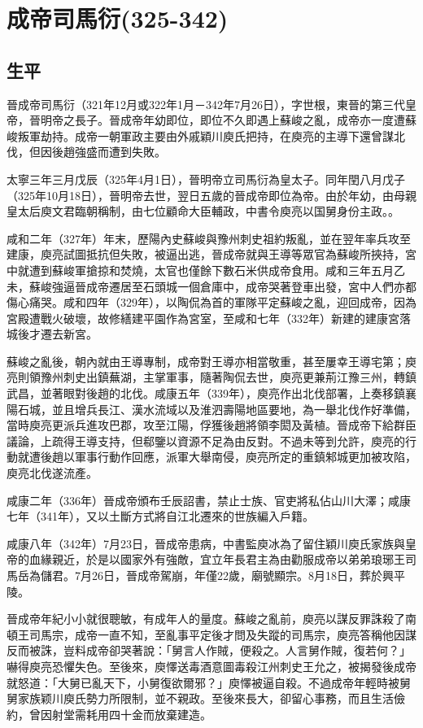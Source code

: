 
\section{成帝司馬衍\tiny(325-342)}

\subsection{生平}

晉成帝司馬衍（321年12月或322年1月－342年7月26日），字世根，東晉的第三代皇帝，晉明帝之長子。晉成帝年幼即位，即位不久即遇上蘇峻之亂，成帝亦一度遭蘇峻叛軍劫持。成帝一朝軍政主要由外戚穎川庾氏把持，在庾亮的主導下還曾謀北伐，但因後趙強盛而遭到失敗。

太寧三年三月戊辰（325年4月1日），晉明帝立司馬衍為皇太子。同年閏八月戊子（325年10月18日），晉明帝去世，翌日五歲的晉成帝即位為帝。由於年幼，由母親皇太后庾文君臨朝稱制，由七位顧命大臣輔政，中書令庾亮以国舅身份主政。。

咸和二年（327年）年末，歷陽內史蘇峻與豫州刺史祖約叛亂，並在翌年率兵攻至建康，庾亮試圖抵抗但失敗，被逼出逃，晉成帝就與王導等眾官為蘇峻所挾持，宮中就遭到蘇峻軍搶掠和焚燒，太官也僅餘下數石米供成帝食用。咸和三年五月乙未，蘇峻強逼晉成帝遷居至石頭城一個倉庫中，成帝哭著登車出發，宮中人們亦都傷心痛哭。咸和四年（329年），以陶侃為首的軍隊平定蘇峻之亂，迎回成帝，因為宮殿遭戰火破壞，故修繕建平園作為宮室，至咸和七年（332年）新建的建康宮落城後才遷去新宮。

蘇峻之亂後，朝內就由王導專制，成帝對王導亦相當敬重，甚至屢幸王導宅第；庾亮則領豫州刺史出鎮蕪湖，主掌軍事，隨著陶侃去世，庾亮更兼荊江豫三州，轉鎮武昌，並著眼對後趙的北伐。咸康五年（339年），庾亮作出北伐部署，上奏移鎮襄陽石城，並且增兵長江、漢水流域以及淮泗壽陽地區要地，為一舉北伐作好準備，當時庾亮更派兵進攻巴郡，攻至江陽，俘獲後趙將領李閎及黃植。晉成帝下給群臣議論，上疏得王導支持，但郗鑒以資源不足為由反對。不過未等到允許，庾亮的行動就遭後趙以軍事行動作回應，派軍大舉南侵，庾亮所定的重鎮邾城更加被攻陷，庾亮北伐遂流產。

咸康二年（336年）晉成帝頒布壬辰詔書，禁止士族、官吏將私佔山川大澤；咸康七年（341年），又以土斷方式將自江北遷來的世族編入戶籍。

咸康八年（342年）7月23日，晉成帝患病，中書監庾冰為了留住穎川庾氏家族與皇帝的血緣親近，於是以國家外有強敵，宜立年長君主為由勸服成帝以弟弟琅琊王司馬岳為儲君。7月26日，晉成帝駕崩，年僅22歲，廟號顯宗。8月18日，葬於興平陵。

晉成帝年紀小小就很聰敏，有成年人的量度。蘇峻之亂前，庾亮以謀反罪誅殺了南頓王司馬宗，成帝一直不知，至亂事平定後才問及失蹤的司馬宗，庾亮答稱他因謀反而被誅，豈料成帝卻哭著說：「舅言人作賊，便殺之。人言舅作賊，復若何？」嚇得庾亮恐懼失色。至後來，庾懌送毒酒意圖毒殺江州刺史王允之，被揭發後成帝就怒道：「大舅已亂天下，小舅復欲爾邪？」庾懌被逼自殺。不過成帝年輕時被舅舅家族颖川庾氏勢力所限制，並不親政。至後來長大，卻留心事務，而且生活儉約，曾因射堂需耗用四十金而放棄建造。


